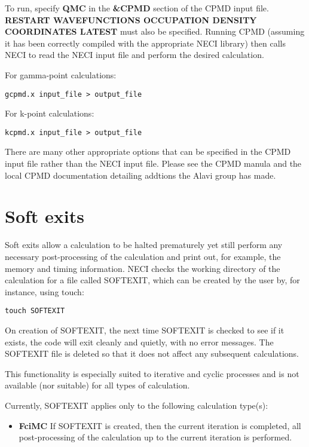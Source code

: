 \documentclass[openany,a4paper,10pt]{manual}
\begin{document}
To run, specify \textbf{QMC} in the \textbf{\&CPMD} section of the CPMD input file.
\textbf{RESTART WAVEFUNCTIONS OCCUPATION DENSITY COORDINATES LATEST} must
also be specified.  Running CPMD (assuming it has been correctly compiled
with the appropriate NECI library) then calls NECI to read the NECI
input file and perform the desired calculation.

For gamma-point calculations:

\begin{Verbatim}[commandchars=@\[\]]
gcpmd.x input_file > output_file
\end{Verbatim}

For k-point calculations:

\begin{Verbatim}[commandchars=@\[\]]
kcpmd.x input_file > output_file
\end{Verbatim}

There are many other appropriate options that can be specified in the
CPMD input file rather than the NECI input file.  Please see the CPMD
manula and the local CPMD documentation detailing addtions the Alavi
group has made.


\section{Soft exits}

Soft exits allow a calculation to be halted prematurely yet still
perform any necessary post-processing of the calculation and print out,
for example, the memory and timing information.  NECI checks the working
directory of the calculation for a file called SOFTEXIT, which can be
created by the user by, for instance, using touch:

\begin{Verbatim}[commandchars=@\[\]]
touch SOFTEXIT
\end{Verbatim}

On creation of SOFTEXIT, the next time SOFTEXIT is checked to see
if it exists, the code will exit cleanly and quietly, with no error
messages.  The SOFTEXIT file is deleted so that it does not affect
any subsequent calculations.

This functionality is especially suited to iterative and cyclic
processes and is not available (nor suitable) for all types of
calculation.

Currently, SOFTEXIT applies only to the following calculation
type(s):
\begin{itemize}
\item {} 
\textbf{FciMC}
If SOFTEXIT is created, then the current iteration is completed,
all post-processing of the calculation up to the current iteration
is performed.

\end{itemize}
\end{document}
